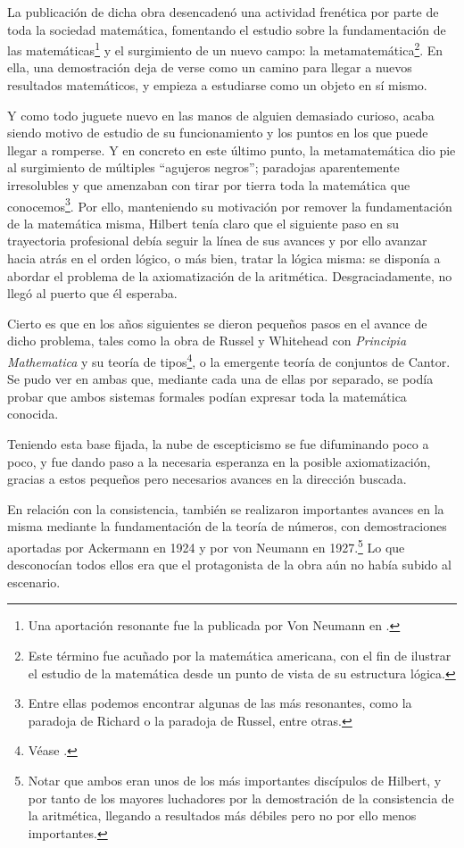 La publicación de dicha obra desencadenó una actividad frenética por parte de toda la sociedad matemática, fomentando el estudio sobre la fundamentación de las matemáticas\footnote{Una aportación resonante fue la publicada por Von Neumann en \cite{v1927hilbertschen}.} y el surgimiento de 
un nuevo campo: la metamatemática\footnote{Este término fue acuñado por la matemática americana, con el fin de ilustrar el estudio de la matemática desde un punto de vista de su estructura lógica.}. En ella, una 
demostración deja de verse como un camino para llegar a nuevos resultados matemáticos, y empieza a estudiarse como un objeto en sí mismo.

Y como todo juguete nuevo en las manos de alguien demasiado curioso, acaba siendo motivo de estudio de su funcionamiento y los puntos en los que puede llegar a romperse. Y en concreto en este último punto, la metamatemática
dio pie al surgimiento de múltiples ``agujeros negros''; paradojas aparentemente irresolubles y que amenzaban con tirar por tierra toda la matemática que conocemos\footnote{Entre ellas 
podemos encontrar algunas de las más resonantes, como la paradoja de Richard o la paradoja de Russel, entre otras.}. Por ello, manteniendo su motivación por remover la fundamentación de la
matemática misma, Hilbert tenía claro que el siguiente paso en su trayectoria profesional debía seguir la línea de sus avances y por ello avanzar hacia atrás en el orden lógico, o más bien, tratar la lógica misma:
se disponía a abordar el problema de la axiomatización de la aritmética. Desgraciadamente, no llegó al puerto que él esperaba.

Cierto es que en los años siguientes se dieron pequeños pasos en el avance de dicho problema, tales como la obra de Russel y Whitehead con \textit{Principia Mathematica}
y su teoría de tipos\footnote{Véase \cite{an1910principia}.}, o la emergente teoría de conjuntos de Cantor. Se pudo ver en ambas que, mediante cada una de ellas por separado, se podía probar 
que ambos sistemas formales podían expresar toda la matemática conocida.

Teniendo esta base fijada, la nube de escepticismo se fue difuminando poco a poco, y fue dando paso a la necesaria esperanza en la posible axiomatización, gracias a estos 
pequeños pero necesarios avances en la dirección buscada. 

En relación con la consistencia, también se realizaron importantes avances en la misma mediante la fundamentación de la teoría de números, con demostraciones aportadas por Ackermann en 1924 y por 
von Neumann en 1927.\footnote{Notar que ambos eran unos de los más importantes discípulos de Hilbert, y por tanto de los mayores luchadores por la demostración de la consistencia de la aritmética, 
llegando a resultados más débiles pero no por ello menos importantes.} Lo que desconocían todos ellos era que el protagonista de la obra aún no había subido al escenario.


